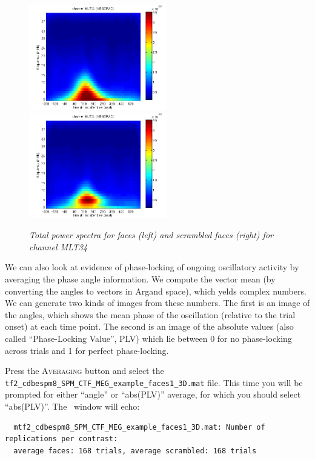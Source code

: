 \begin{figure}
\begin{center}
\includegraphics[width=60mm]{multimodal/figures/meg_pow_faces}
\includegraphics[width=60mm]{multimodal/figures/meg_pow_scrambled}
\caption{\em  Total power spectra for faces (left) and scrambled faces (right) for channel MLT34\label{multimodal:fig:13}}
\end{center}
\end{figure}

We can also look at evidence of phase-locking of ongoing oscillatory activity by averaging the phase angle information. We compute the vector mean (by converting the angles to vectors in Argand space), which yelds  complex numbers. We can generate two kinds of images from these numbers. The first is an image of the angles, which shows the mean phase of the oscillation (relative to the trial onset) at each time point. The second is an image of the absolute values (also called ``Phase-Locking Value'', PLV) which lie between 0 for no phase-locking across trials and 1 for perfect phase-locking.

Press the \textsc{Averaging} button and select the \texttt{tf2\_\-cdbespm8\_\-SPM\_\-CTF\_\-MEG\_\-example\_\-faces1\_\-3D.mat} file. This time you will be prompted for either ``angle'' or ``abs(PLV)'' average, for which you should select ``abs(PLV)''. The \matlab\ window will echo:

\begin{verbatim}
  mtf2_cdbespm8_SPM_CTF_MEG_example_faces1_3D.mat: Number of replications per contrast:
  average faces: 168 trials, average scrambled: 168 trials
\end{verbatim}

